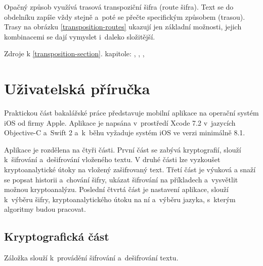 \documentclass[glossaries, index]{kidiplom}
\begin{document}
Opačný způsob využívá trasová transpoziční šifra (route šifra). Text se do obdelníku zapíše vždy stejně a~poté se přečte specifickým způsobem (trasou). Trasy na obrázku \ref{transposition-routes} ukazují jen základní možnosti, jejich kombinacemi se dají vymyslet i~daleko složitější.


\vspace*{\fill}

\noindent
Zdroje k \ref{transposition-section}. kapitole: \cite{transpositionwiki}, \cite{columntranspositionwiki}, \cite{transpositionwiki-en}, \cite{singh2009}

\newpage



\section{Uživatelská příručka}
Praktickou část bakalářské práce představuje mobilní aplikace na operační systém iOS od firmy Apple. Aplikace je napsána v~prostředí Xcode 7.2 v~jazycích Objective-C a~Swift 2 a~k~běhu vyžaduje systém iOS ve verzi minimálně 8.1.

Aplikace je rozdělena na čtyři části. První část se zabývá kryptografií, slouží k~šifrování a~dešifrování vloženého textu. V druhé části lze vyzkoušet kryptoanalytické útoky na vložený zašifrovaný text. Třetí část je výuková a snaží se popsat historii a~chování šifry, ukázat šifrování na příkladech a~vysvětlit možnou kryptoanalýzu. Poslední čtvrtá část je nastavení aplikace, slouží k~výběru šifry, kryptoanalytického útoku na ní a~výběru jazyka, s~kterým algoritmy budou pracovat.

\subsection{Kryptografická část}
\label{app-encryption-section}
Záložka  slouží k~provádění šifrování a~dešifrování textu. 
\end{document}
